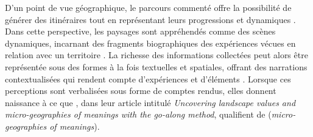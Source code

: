 \begin{refsegment}
D’un point de vue géographique, le parcours commenté offre la possibilité de générer des itinéraires tout en représentant leurs progressions et dynamiques \textcolor{blue}{\autocite[94]{jones_spatial_2012}}. Dans cette perspective, les paysages sont appréhendés comme des scènes dynamiques, incarnant des fragments biographiques des expériences vécues en relation avec un territoire \textcolor{blue}{\autocite[112]{bergeron_uncovering_2014}}. La richesse des informations collectées peut alors être représentée sous des formes à la fois textuelles et spatiales, offrant des narrations contextualisées qui rendent compte d’expériences  et d’éléments  \textcolor{blue}{\autocite[109]{bergeron_uncovering_2014}}. Lorsque ces perceptions sont verbalisées sous forme de comptes rendus, elles donnent naissance à ce que \textcolor{blue}{\textcite[116]{bergeron_uncovering_2014}}, dans leur article intitulé \textsl{Uncovering landscape values and micro-geographies of meanings with the go-along method}, qualifient de  (\textsl{micro-geographies of meanings}).%


\end{refsegment}
